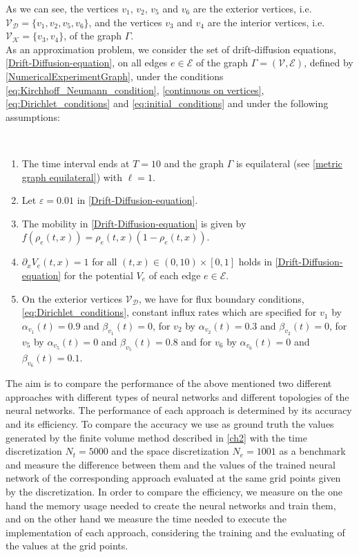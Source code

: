 As we can see, the vertices $v_1$, $v_2$, $v_5$ and $v_6$ are the exterior vertices, i.e. $\mathcal{V}_{\mathcal{D}} = \{v_1, v_2, v_5, v_6\}$, and the vertices $v_3$ and $v_4$ are the interior vertices, i.e. $\mathcal{V}_{\mathcal{K}} = \{v_3, v_4\}$, of the graph $\Gamma$. \\
As an approximation problem, we consider the set of drift-diffusion equations, \cref{Drift-Diffusion-equation}, on all edges $e \in \mathcal{E}$ of the graph $\Gamma = (\mathcal{V}, \mathcal{E})$, defined by \cref{NumericalExperimentGraph}, under the conditions \cref{eq:Kirchhoff_Neumann_condition}, \cref{continuous on vertices}, \cref{eq:Dirichlet_conditions} and \cref{eq:initial_conditions} and under the following assumptions:
\begin{assumption} 
    \ \\[-1.5\baselineskip]
    \begin{enumerate}
        \item The time interval ends at $T = 10$ and the graph $\Gamma$ is equilateral (see \cref{metric graph equilateral}) with $\ell = 1$. 
        \item Let $\varepsilon = 0.01$ in \cref{Drift-Diffusion-equation}.
        \item The mobility in \cref{Drift-Diffusion-equation} is given by $f(\rho_e(t,x)) = \rho_e (t,x)(1-\rho_e (t,x))$.
        \item $\partial_x V_e (t,x) = 1$ for all $(t,x) \in (0, 10) \times [0,1]$ holds in \cref{Drift-Diffusion-equation} for the potential $V_e$ of each edge $e \in \mathcal{E}$. 
        \item On the exterior vertices $\mathcal{V}_{\mathcal{D}}$, we have for flux boundary conditions, \cref{eq:Dirichlet_conditions}, constant influx rates which are specified for $v_1$ by $\alpha_{v_1}(t) = 0.9$ and $\beta_{v_1}(t) = 0$, for $v_2$ by $\alpha_{v_2}(t) = 0.3$ and $\beta_{v_2}(t) = 0$, for $v_5$ by $\alpha_{v_5}(t) = 0$ and $\beta_{v_5}(t) = 0.8$ and for $v_6$ by $\alpha_{v_6}(t) = 0$ and $\beta_{v_6}(t) = 0.1$.
    \end{enumerate}
\end{assumption}
The aim is to compare the performance of the above mentioned two different approaches with different types of neural networks and different topologies of the neural networks. The performance of each approach is determined by its accuracy and its efficiency. To compare the accuracy we use as ground truth the values generated by the finite volume method described in \cref{ch2} with the time discretization $N_t = 5000$ and the space discretization $N_e = 1001$ as a benchmark and measure the difference between them and the values of the trained neural network of the corresponding approach evaluated at the same grid points given by the discretization. In order to compare the efficiency, we measure on the one hand the memory usage needed to create the neural networks and train them, and on the other hand we measure the time needed to execute the implementation of each approach, considering the training and the evaluating of the values at the grid points. \\
